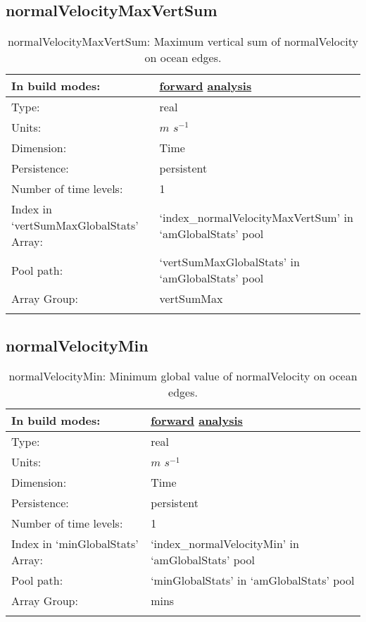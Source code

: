 \subsection[normalVelocityMaxVertSum]{normalVelocityMaxVertSum}
\label{subsec:var_sec_amGlobalStats_normalVelocityMaxVertSum}
\begin{center}
\begin{longtable}{| p{2.0in} | p{4.0in} |}
        \hline 
        In build modes: & \hyperref[subsec:forward_var_tab_amGlobalStats]{forward} \hyperref[subsec:analysis_var_tab_amGlobalStats]{analysis} \\
        \hline 
        Type: & real \\
        \hline 
        Units: & $m$ $s^{-1}$ \\
        \hline 
        Dimension: & Time \\
        \hline 
        Persistence: & persistent \\
        \hline 
        Number of time levels: & 1 \\
        \hline 
		 Index in `vertSumMaxGlobalStats' Array: & `index\_normalVelocityMaxVertSum' in `amGlobalStats' pool \\
		 \hline 
            Pool path: & `vertSumMaxGlobalStats' in `amGlobalStats' pool \\
		 \hline 
		 Array Group: & vertSumMax \\
		 \hline 
    \caption{normalVelocityMaxVertSum: Maximum vertical sum of normalVelocity on ocean edges.}
\end{longtable}
\end{center}
\subsection[normalVelocityMin]{normalVelocityMin}
\label{subsec:var_sec_amGlobalStats_normalVelocityMin}
\begin{center}
\begin{longtable}{| p{2.0in} | p{4.0in} |}
        \hline 
        In build modes: & \hyperref[subsec:forward_var_tab_amGlobalStats]{forward} \hyperref[subsec:analysis_var_tab_amGlobalStats]{analysis} \\
        \hline 
        Type: & real \\
        \hline 
        Units: & $m$ $s^{-1}$ \\
        \hline 
        Dimension: & Time \\
        \hline 
        Persistence: & persistent \\
        \hline 
        Number of time levels: & 1 \\
        \hline 
		 Index in `minGlobalStats' Array: & `index\_normalVelocityMin' in `amGlobalStats' pool \\
		 \hline 
            Pool path: & `minGlobalStats' in `amGlobalStats' pool \\
		 \hline 
		 Array Group: & mins \\
		 \hline 
    \caption{normalVelocityMin: Minimum global value of normalVelocity on ocean edges.}
\end{longtable}
\end{center}
